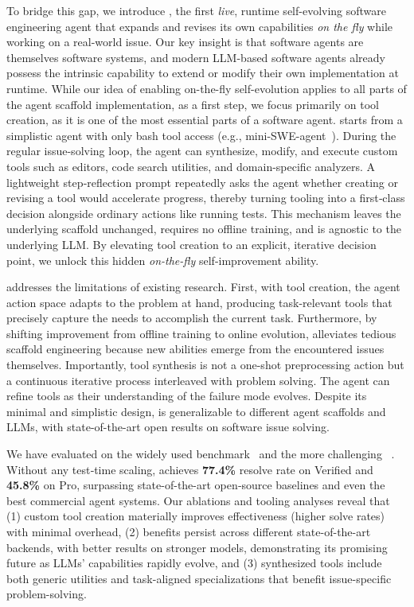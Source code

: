 To bridge this gap,
we introduce \livesweagent, the first
\emph{live}, runtime self-evolving software engineering agent that expands and
revises its own capabilities \emph{on the fly} while working on a real-world issue.
Our key insight is that software agents are themselves software systems, and modern LLM-based software agents already possess the intrinsic capability to extend or modify their own implementation at runtime.
{While our idea of enabling on-the-fly self-evolution applies to all parts of the agent scaffold implementation, as a first step, we focus primarily on tool creation, as it is one of the most essential parts of a software agent.}
{\tech} starts from a simplistic agent with only bash tool access (e.g., mini-SWE-agent~\cite{yang2024sweagent}).
During {the} regular issue-solving loop, {the agent} can synthesize, modify, and execute custom tools such as editors, code search utilities, and domain-specific analyzers.
A lightweight step‑reflection prompt repeatedly asks the agent whether creating or revising a tool would accelerate progress, thereby turning tooling into a first‑class decision alongside ordinary actions like running tests.
This mechanism leaves the underlying scaffold unchanged, requires no offline training, and is agnostic to the underlying LLM.
By elevating tool creation to an explicit, iterative decision point, we unlock this hidden \emph{on-the-fly} self-improvement ability.

\livesweagent addresses the limitations of existing research.
First, with tool creation, the agent action space adapts to the problem at hand, producing task-relevant tools that precisely capture the needs to accomplish the current task.
Furthermore, by shifting improvement from offline training to online evolution, \livesweagent alleviates tedious scaffold engineering because new abilities emerge from the encountered issues themselves.
Importantly, tool synthesis is not a one-shot preprocessing action but a continuous iterative process interleaved with problem solving. The agent can refine tools as their understanding of the failure mode evolves.
Despite its minimal and simplistic design, \livesweagent is generalizable to different agent scaffolds and LLMs, with state-of-the-art open results on software issue solving.

We have evaluated \livesweagent on the widely used \sbv benchmark~\cite{sbv} and the more challenging \swebenchpro~\cite{deng2025swe}. Without any test‑time scaling, \livesweagent achieves \textbf{77.4\%} resolve rate on Verified and \textbf{45.8\%} on Pro, surpassing state-of-the-art open‑source baselines and{ even} the best commercial agent systems.
Our ablations and tooling analyses reveal that (1) custom tool creation materially improves effectiveness (higher solve rates) with minimal overhead,
(2) benefits persist across different state-of-the-art \llm backends, with better results on stronger models, demonstrating its promising future as LLMs' capabilities rapidly evolve,
and (3) synthesized tools include both generic utilities and task-aligned specializations that benefit issue-specific problem-solving.

